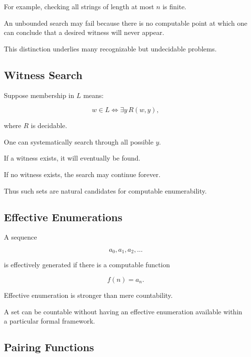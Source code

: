 For example, checking all strings of length at most \(n\) is finite.

An unbounded search may fail because there is no computable point at which
one can conclude that a desired witness will never appear.

This distinction underlies many recognizable but undecidable problems.

\subsection{Witness Search}
\label{subsec:computable-witness-search}

Suppose membership in \(L\) means:

\[
\boxed{
w\in L
\iff
\exists y\,R(w,y),
}
\]

where \(R\) is decidable.

One can systematically search through all possible \(y\).

If a witness exists, it will eventually be found.

If no witness exists, the search may continue forever.

Thus such sets are natural candidates for computable enumerability.

\subsection{Effective Enumerations}
\label{subsec:effective-enumerations}

A sequence

\[
a_0,a_1,a_2,\ldots
\]

is effectively generated if there is a computable function

\[
\boxed{
f(n)=a_n.
}
\]

Effective enumeration is stronger than mere countability.

A set can be countable without having an effective enumeration available
within a particular formal framework.

\subsection{Pairing Functions}
\label{subsec:computable-pairing-functions}

